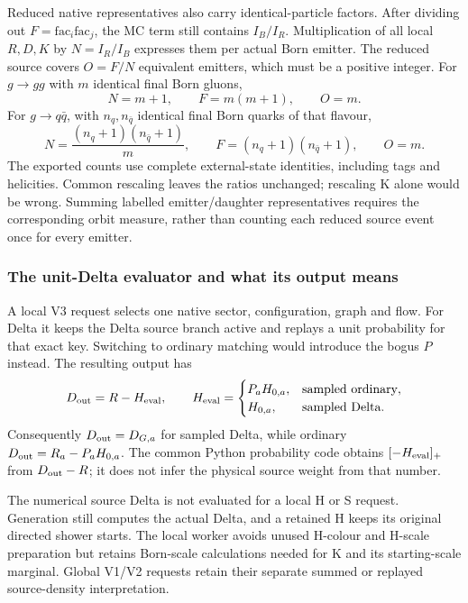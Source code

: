 Reduced native representatives also carry identical-particle factors.
After dividing out $F=\mathrm{fac}_i\mathrm{fac}_j$, the MC term still
contains $I_B/I_R$. Multiplication of all local $R,D,K$ by
$N=I_R/I_B$ expresses them per actual Born emitter. The reduced source
covers $O=F/N$ equivalent emitters, which must be a positive integer.
For $g\to gg$ with $m$ identical final Born gluons,
\begin{equation}
 N=m+1,\qquad F=m(m+1),\qquad O=m.
\end{equation}
For $g\to q\bar q$, with $n_q,n_{\bar q}$ identical final Born quarks
of that flavour,
\begin{equation}
 N=\frac{(n_q+1)(n_{\bar q}+1)}{m},\qquad
 F=(n_q+1)(n_{\bar q}+1),\qquad O=m.
\end{equation}
The exported counts use complete external-state identities, including
tags and helicities. Common rescaling leaves the ratios unchanged;
rescaling K alone would be wrong. Summing labelled emitter/daughter
representatives requires the corresponding orbit measure, rather than
counting each reduced source event once for every emitter.

\subsubsection{The unit-Delta evaluator and what its output means}

A local V3 request selects one native sector, configuration, graph and
flow. For Delta it keeps the Delta source branch active and replays a
unit probability for that exact key. Switching to ordinary matching
would introduce the bogus $P$ instead. The resulting output has
\begin{equation}
 D_{\rm out}=R-H_{\rm eval},\qquad
 H_{\rm eval}=\begin{cases}
 P_aH_{0,a},&\text{sampled ordinary},\\
 H_{0,a},&\text{sampled Delta}.
 \end{cases}
 \label{eq:component-evaluator-output}
\end{equation}
Consequently $D_{\rm out}=D_{G,a}$ for sampled Delta, while ordinary
$D_{\rm out}=R_a-P_aH_{0,a}$. The common Python probability code obtains
$[-H_{\rm eval}]_+$ from $D_{\rm out}-R$; it does not infer the
physical source weight from that number.

The numerical source Delta is not evaluated for a local H or S request.
Generation still computes the actual Delta, and a retained H keeps its
original directed shower starts. The local worker avoids unused H-colour
and H-scale preparation but retains Born-scale calculations needed for
K and its starting-scale marginal. Global V1/V2 requests retain their
separate summed or replayed source-density interpretation.


